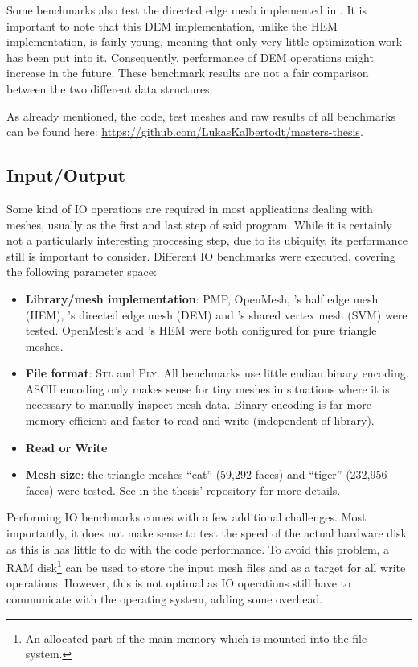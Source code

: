 Some benchmarks also test the directed edge mesh implemented in .
It is important to note that this DEM implementation, unlike the HEM implementation, is fairly young, meaning that only very little optimization work has been put into it.
Consequently, performance of DEM operations might increase in the future.
These benchmark results are not a fair comparison between the two different data structures.

As already mentioned, the code, test meshes and raw results of all benchmarks can be found here: \url{https://github.com/LukasKalbertodt/masters-thesis}.


\newpage
\subsection{Input/Output}

Some kind of IO operations are required in most applications dealing with meshes, usually as the first and last step of said program.
While it is certainly not a particularly interesting processing step, due to its ubiquity, its performance still is important to consider.
Different IO benchmarks were executed, covering the following parameter space:

\begin{itemize}
  \item \textbf{Library/mesh implementation}: PMP, OpenMesh, 's half edge mesh (HEM), 's directed edge mesh (DEM) and 's shared vertex mesh (SVM) were tested.
  OpenMesh's and 's HEM were both configured for pure triangle meshes.
  \item \textbf{File format}: \textsc{Stl} and \textsc{Ply}.
  All benchmarks use little endian binary encoding.
  ASCII encoding only makes sense for tiny meshes in situations where it is necessary to manually inspect mesh data.
  Binary encoding is far more memory efficient and faster to read and write (independent of library).
  \item \textbf{Read or Write}
  \item \textbf{Mesh size}: the triangle meshes \enquote{cat} (59,292 faces) and \enquote{tiger} (232,956 faces) were tested.
  See  in the thesis' repository for more details.
\end{itemize}

Performing IO benchmarks comes with a few additional challenges.
Most importantly, it does not make sense to test the speed of the actual hardware disk as this is has little to do with the code performance.
To avoid this problem, a RAM disk\footnote{An allocated part of the main memory which is mounted into the file system.} can be used to store the input mesh files and as a target for all write operations.
However, this is not optimal as IO operations still have to communicate with the operating system, adding some overhead.

